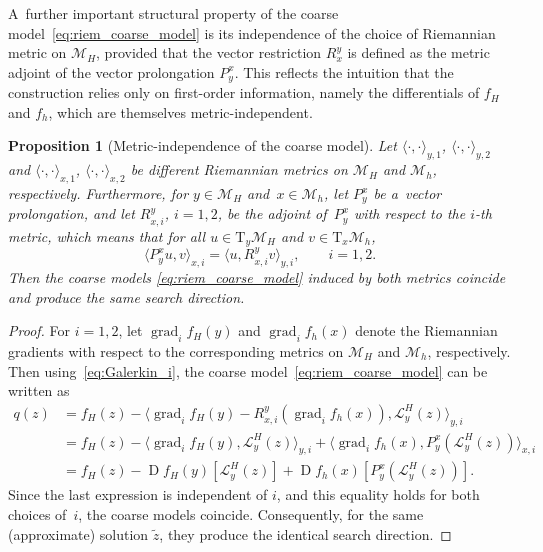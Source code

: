 \documentclass[11pt,reqno]{amsart}
\theoremstyle{plain}
\newtheorem{prop}[thm]{Proposition}
\DeclareMathOperator{\Drm}{D}
\DeclareMathOperator{\grad}{grad}
\newcommand{\M}{\mathcal{M}}
\newcommand{\Tan}{\mathrm{T}}
\newcommand{\invRet}{\mathcal L}
\begin{document}
	A~further important structural property of the coarse model~\eqref{eq:riem_coarse_model} is its independence of the choice of Riemannian metric on $\M_H$, provided that the vector restriction $R_x^y$ is defined as the metric adjoint of the vector prolongation $P_y^x$. This reflects the intuition that the construction relies only on first-order information, namely the differentials of $f_H$ and $f_h$, which are themselves metric-independent.
	
	\begin{prop}[Metric-independence of the coarse model] \label{prop:metric_independence}
		Let $\langle\cdot, \cdot \rangle_{y,1}$, $\langle\cdot, \cdot \rangle_{y,2}$ and $\langle\cdot, \cdot \rangle_{x,1}$, $\langle\cdot, \cdot \rangle_{x,2}$ be different Riemannian metrics on $\M_H$ and $\M_h$, respectively. Furthermore, for \mbox{$y \in \M_H$} and~$x \in \M_h$, let $P_{y}^{x}$ be a~vector prolongation, and let $R_{x,i}^{y}$, $i = 1,2$, be the adjoint of~$P_{y}^{x}$ with respect to the $i$-th metric, which means that for all $u \in \Tan_{y} \M_H$ and $v\in \Tan_{x} \M_h$, 
		\begin{equation}\label{eq:Galerkin_i}
			\big\langle P_{y}^{x}u, v \big\rangle_{x,i} 
			= \big\langle u, R_{x,i}^{y}v \big\rangle_{y,i} , \qquad i = 1,2.
		\end{equation}
		Then the coarse models \eqref{eq:riem_coarse_model} induced by both metrics coincide and produce the same search direction.
	\end{prop}
	\begin{proof}
		For $i =1,2$, let $\grad_{i} f_H(y)$ and $\grad_{i} f_h(x)$ denote the Riemannian gradients with respect to the corresponding metrics on $\M_H$ and $\M_h$, respectively. Then using~\eqref{eq:Galerkin_i}, the coarse model~\eqref{eq:riem_coarse_model} can be written as 
		\begin{equation*}
			\begin{aligned}
				q(z) &=  f_H(z) - \big\langle \grad_{i} f_H(y)-R_{x,i}^{y}(\grad_{i} f_h(x)), \invRet^H_{y}(z)\big\rangle_{y,i} \\
				&
				= f_H(z)  - \big\langle \grad_{i} f_H(y), \invRet^H_{y}(z)\big\rangle_{y,i} 
				+ \big\langle \grad_{i} f_h(x), P_{y}^{x}(\invRet^H_{y}(z)) \big\rangle_{x,i} \\
				&= f_H(z)  - \Drm f_H(y)[\invRet^H_{y}(z)] + \Drm f_h(x) [P_{y}^{x}(\invRet^H_{y}(z))] .
			\end{aligned}
		\end{equation*}
		Since the last expression is independent of $i$, and this equality holds for both choices of~$i$, the coarse models coincide. Consequently, for the same (approximate) solution $\tilde{z}$, they produce the identical search direction.
	\end{proof}
	
\end{document}

